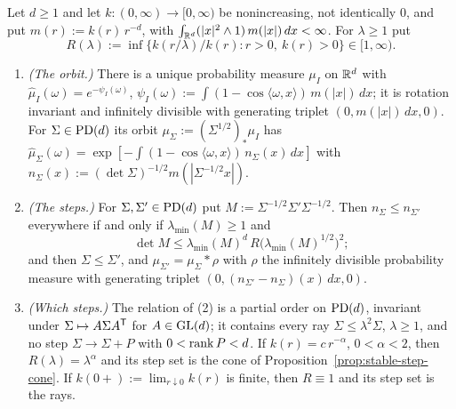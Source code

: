 \begin{proposition}\label{prop:orbit-step-cone}
Let $d \ge 1$ and let $k : (0,\infty) \to [0,\infty)$ be nonincreasing, not identically $0$, and put
$m(r) := k(r)\,r^{-d}$, with $\int_{\mathbb{R}^d}(|x|^2 \wedge 1)\,m(|x|)\,dx < \infty$. For $\lambda \ge 1$ put
\[
  R(\lambda) := \inf\{k(r/\lambda)/k(r) : r > 0,\ k(r) > 0\} \in [1, \infty) .
\]
\begin{enumerate}
\item \emph{(The orbit.)} There is a unique probability measure $\mu_I$ on $\mathbb{R}^d$ with
$\widehat\mu_I(\omega) = e^{-\psi_I(\omega)}$, $\psi_I(\omega) := \int(1 - \cos\langle\omega,x\rangle)\,
m(|x|)\,dx$; it is rotation invariant and infinitely divisible with generating triplet
$(0, m(|x|)\,dx, 0)$. For $\Sigma \in \mathrm{PD}(d)$ its orbit $\mu_\Sigma := (\Sigma^{1/2})_*\mu_I$ has
$\widehat\mu_\Sigma(\omega) = \exp[-\int(1 - \cos\langle\omega,x\rangle)\,n_\Sigma(x)\,dx]$ with
$n_\Sigma(x) := (\det\Sigma)^{-1/2}m(|\Sigma^{-1/2}x|)$.
\item \emph{(The steps.)} For $\Sigma, \Sigma' \in \mathrm{PD}(d)$ put $M := \Sigma^{-1/2}\Sigma'\Sigma^{-1/2}$.
Then $n_\Sigma \le n_{\Sigma'}$ everywhere if and only if $\lambda_{\min}(M) \ge 1$ and
\[
  \det M \le \lambda_{\min}(M)^d\,R\bigl(\lambda_{\min}(M)^{1/2}\bigr)^2 ;
\]
and then $\Sigma \le \Sigma'$, and $\mu_{\Sigma'} = \mu_\Sigma * \rho$ with $\rho$ the infinitely
divisible probability measure with generating triplet $(0, (n_{\Sigma'} - n_\Sigma)(x)\,dx, 0)$.
\item \emph{(Which steps.)} The relation of (2) is a partial order on $\mathrm{PD}(d)$, invariant under
$\Sigma \mapsto A\Sigma A^{\mathsf{T}}$ for $A \in \mathrm{GL}(d)$; it contains every ray $\Sigma \le \lambda^2\Sigma$,
$\lambda \ge 1$, and no step $\Sigma \to \Sigma + P$ with $0 < \operatorname{rank} P < d$. If
$k(r) = c\,r^{-\alpha}$, $0 < \alpha < 2$, then $R(\lambda) = \lambda^\alpha$ and its step set is the cone of
Proposition~\ref{prop:stable-step-cone}. If $k(0{+}) := \lim_{r\downarrow0}k(r)$ is finite, then $R \equiv 1$ and
its step set is the rays.
\end{enumerate}
\end{proposition}

